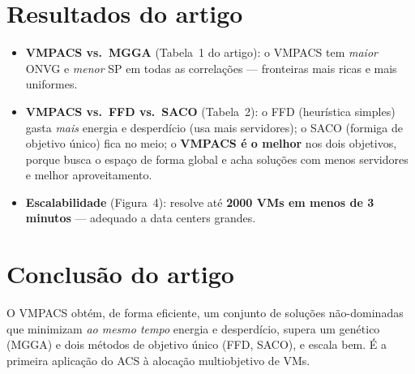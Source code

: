 \documentclass[11pt]{article}
\begin{document}
\section{Resultados do artigo}
\begin{itemize}[leftmargin=1.4em,itemsep=2pt]
  \item \textbf{VMPACS vs.\ MGGA} (Tabela~1 do artigo): o VMPACS tem
  \emph{maior} ONVG e \emph{menor} SP em todas as correlações — fronteiras mais
  ricas e mais uniformes.
  \item \textbf{VMPACS vs.\ FFD vs.\ SACO} (Tabela~2): o FFD (heurística simples)
  gasta \emph{mais} energia e desperdício (usa mais servidores); o SACO
  (formiga de objetivo único) fica no meio; o \textbf{VMPACS é o melhor} nos dois
  objetivos, porque busca o espaço de forma global e acha soluções com menos
  servidores e melhor aproveitamento.
  \item \textbf{Escalabilidade} (Figura~4): resolve até \textbf{2000 VMs em menos
  de 3 minutos} — adequado a data centers grandes.
\end{itemize}

\section{Conclusão do artigo}
O VMPACS obtém, de forma eficiente, um conjunto de soluções não-dominadas que
minimizam \emph{ao mesmo tempo} energia e desperdício, supera um genético
(MGGA) e dois métodos de objetivo único (FFD, SACO), e escala bem. É a primeira
aplicação do ACS à alocação multiobjetivo de VMs.

\end{document}
